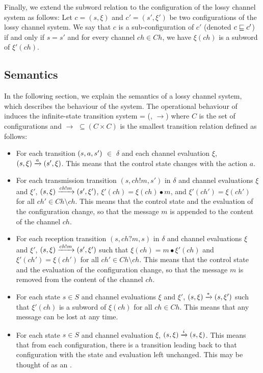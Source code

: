 Finally, we extend the subword relation to the configuration of the lossy channel system as follows: Let $c=(s,\xi)$ and $c'=(s',\xi')$ be two configurations of the lossy channel system. We say that $c$ is a sub-configuration of $c'$ (denoted  $c \sqsubseteq c'$) if and only if $s=s'$ and for every channel $ch \in Ch$, we have $\xi(ch)$ is a subword of $\xi'(ch)$.

\subsection{Semantics}
\label{LTS}
In the following section, we explain the semantics of a lossy channel system, which describes the behaviour of the system. The operational behaviour of  induces the infinite-state transition system  = (, $\rightarrow$) where $C$ is the set of configurations and $\rightarrow$ $\subseteq (C \times C)$ is the smallest transition relation defined as follows:
  \begin{itemize}
    \item For each transition $(s, a, s')$ $\in$ $\delta$ and each channel evaluation $\xi$, $(s, \xi) \xrightarrow{a} (s', \xi)$. This means that the control state changes with the action $a$.
    \item For each transmission transition $( s, ch!m, s' )$ in $\delta$ and channel evaluations $\xi$ and $\xi'$, $(s, \xi) \xrightarrow{ch!m} (s', \xi')$, $\xi'(ch) = \xi(ch)\bullet m$, and $\xi'(ch')=\xi(ch')$ for all $ch' \in Ch \setminus ch$. This means that the control state and the evaluation of the configuration change, so that the message $m$ is appended to the content of the channel $ch$.
    \item For each reception transition $( s, ch?m, s )$ in $\delta$ and channel evaluations $\xi$ and $\xi'$, $(s, \xi) \xrightarrow{ch!m} (s', \xi')$ such that $\xi(ch)=m \bullet \xi'(ch) $ and $\xi'(ch')=\xi(ch')$ for all $ch' \in Ch \setminus ch$. This means that the control state and the evaluation of the configuration change, so that the message $m$ is removed from the content of the channel $ch$.
    \item For each state $s \in S$ and channel evaluations $\xi$ and $\xi'$, $(s, \xi) \xrightarrow{*} (s, \xi')$ such that $\xi'(ch)$ is a subword of $\xi(ch)$ for all $ch \in Ch$. This means that any message can be lost at any time.
    \item For each state $s \in S$ and channel evaluation $\xi$, $(s, \xi) \xrightarrow{i} (s, \xi)$. This means that from each configuration, there is a transition leading back to that configuration with the state and evaluation left unchanged. This may be thought of as an .
  \end{itemize}

